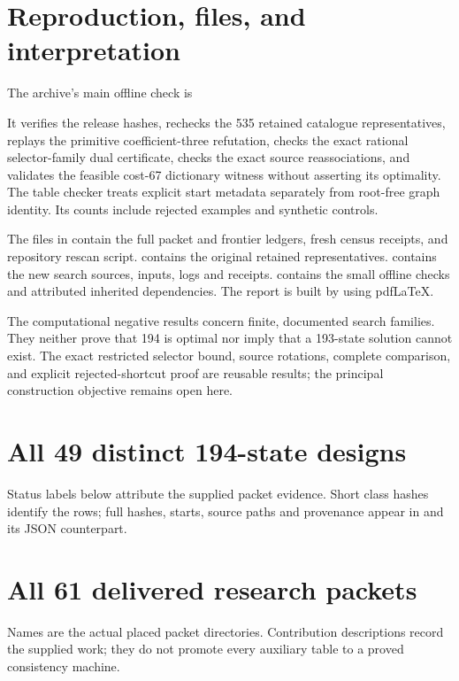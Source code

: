 \documentclass[11pt]{article}
\newcommand{\code}[1]{\texttt{\detokenize{#1}}}
\begin{document}
\section{Reproduction, files, and interpretation}
The archive's main offline check is
\begin{center}\code{python3 verify.py}\end{center}
It verifies the release hashes, rechecks the 535 retained catalogue representatives, replays the primitive coefficient-three refutation, checks the exact rational selector-family dual certificate, checks the exact source reassociations, and validates the feasible cost-67 dictionary witness without asserting its optimality. The table checker treats explicit start metadata separately from root-free graph identity. Its counts include rejected examples and synthetic controls.

The files in  contain the full packet and frontier ledgers, fresh census receipts, and repository rescan script.  contains the original retained representatives.  contains the new search sources, inputs, logs and receipts.  contains the small offline checks and attributed inherited dependencies. The report is built by \code{sh build_report.sh} using pdfLaTeX.

The computational negative results concern finite, documented search families. They neither prove that 194 is optimal nor imply that a 193-state solution cannot exist. The exact restricted selector bound, source rotations, complete comparison, and explicit rejected-shortcut proof are reusable results; the principal construction objective remains open here.

\appendix
\section{All 49 distinct 194-state designs}\label{app:frontier}
\noindent Status labels below attribute the supplied packet evidence. Short class hashes identify the rows; full hashes, starts, source paths and provenance appear in  and its JSON counterpart.


\section{All 61 delivered research packets}\label{app:packets}
\noindent Names are the actual placed packet directories. Contribution descriptions record the supplied work; they do not promote every auxiliary table to a proved consistency machine.

\end{document}
